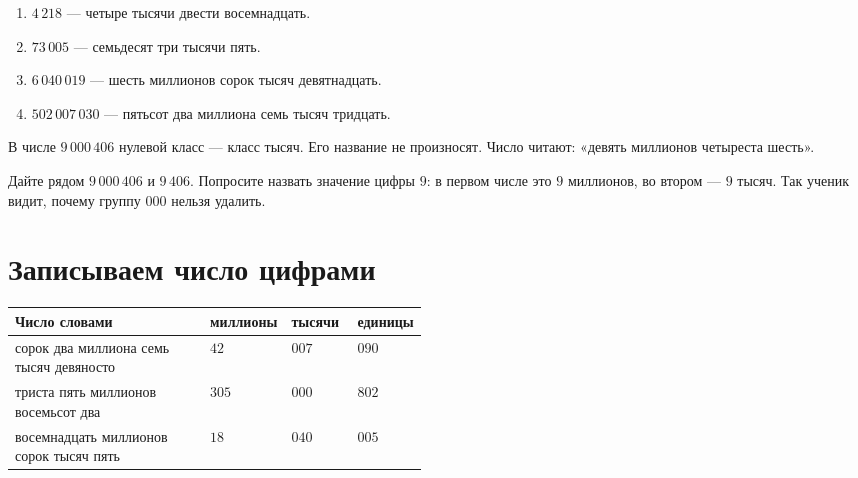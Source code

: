 \readingroutefigure

\begin{fillbox}[Ответы]
  \begin{enumerate}
    \item \(4\,218\) --- четыре тысячи двести восемнадцать.
    \item \(73\,005\) --- семьдесят три тысячи пять.
    \item \(6\,040\,019\) --- шесть миллионов сорок тысяч девятнадцать.
    \item \(502\,007\,030\) --- пятьсот два миллиона семь тысяч тридцать.
  \end{enumerate}
\end{fillbox}

\zeroclassfigure

В числе \(9\,000\,406\) нулевой класс --- класс тысяч. Его название не
произносят. Число читают: «девять миллионов четыреста шесть».

\begin{teacherbox}
  Дайте рядом \(9\,000\,406\) и \(9\,406\). Попросите назвать значение
  цифры \(9\): в первом числе это \(9\) миллионов, во втором --- \(9\) тысяч.
  Так ученик видит, почему группу \(000\) нельзя удалить.
\end{teacherbox}

\section{Записываем число цифрами}

\writingclassesfigure

\begin{fillbox}
  \renewcommand{\arraystretch}{1.5}
  \begin{tabularx}{\linewidth}{@{}X>{\centering\arraybackslash}p{0.16\linewidth}>{\centering\arraybackslash}p{0.16\linewidth}>{\centering\arraybackslash}p{0.16\linewidth}@{}}
    \toprule
    \rowcolor{TableHeader}
    Число словами & миллионы & тысячи & единицы \\
    \midrule
    сорок два миллиона семь тысяч девяносто & \(42\) & \(007\) & \(090\) \\
    триста пять миллионов восемьсот два & \(305\) & \(000\) & \(802\) \\
    восемнадцать миллионов сорок тысяч пять & \(18\) & \(040\) & \(005\) \\
    \bottomrule
  \end{tabularx}
\end{fillbox}

